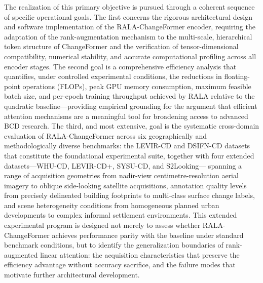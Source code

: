 The realization of this primary objective is pursued through a coherent sequence
of specific operational goals. The first concerns the rigorous architectural
design and software implementation of the RALA-ChangeFormer encoder, requiring
the adaptation of the rank-augmentation mechanism to the multi-scale, hierarchical
token structure of ChangeFormer \cite{Bandara2022ChangeFormer} and the
verification of tensor-dimensional compatibility, numerical stability, and
accurate computational profiling across all encoder stages. The second goal is
a comprehensive efficiency analysis that quantifies, under controlled experimental
conditions, the reductions in floating-point operations (FLOPs), peak GPU memory
consumption, maximum feasible batch size, and per-epoch training throughput
achieved by RALA relative to the quadratic baseline---providing empirical grounding
for the argument that efficient attention mechanisms are a meaningful tool for
broadening access to advanced BCD research. The third, and most extensive, goal
is the systematic cross-domain evaluation of RALA-ChangeFormer across six
geographically and methodologically diverse benchmarks: the LEVIR-CD and
DSIFN-CD datasets that constitute the foundational experimental suite, together
with four extended datasets---WHU-CD, LEVIR-CD+, SYSU-CD, and S2Looking---
spanning a range of acquisition geometries from nadir-view centimetre-resolution
aerial imagery to oblique side-looking satellite acquisitions, annotation quality
levels from precisely delineated building footprints to multi-class surface
change labels, and scene heterogeneity conditions from homogeneous planned urban
developments to complex informal settlement environments. This extended
experimental program is designed not merely to assess whether RALA-ChangeFormer
achieves performance parity with the baseline under standard benchmark conditions,
but to identify the generalization boundaries of rank-augmented linear attention:
the acquisition characteristics that preserve the efficiency advantage without
accuracy sacrifice, and the failure modes that motivate further architectural
development.

